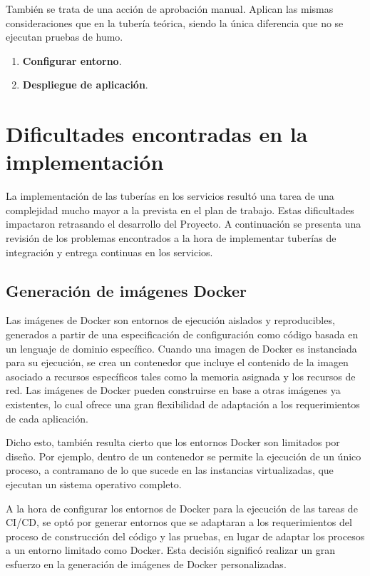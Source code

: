 También se trata de una acción de aprobación manual. Aplican las
mismas consideraciones que en la tubería teórica, siendo la única
diferencia que no se ejecutan pruebas de humo.

\begin{enumerate}
\item \textbf{Configurar entorno}.
\item \textbf{Despliegue de aplicación}.
\end{enumerate}
\section{Dificultades encontradas en la implementación}

La implementación de las tuberías en los servicios resultó una tarea
de una complejidad mucho mayor a la prevista en el plan de
trabajo. Estas dificultades impactaron retrasando el desarrollo del
Proyecto. A continuación se presenta una revisión de los problemas
encontrados a la hora de implementar tuberías de integración y entrega
continuas en los servicios.

\subsection{Generación de imágenes Docker}

Las imágenes de Docker son entornos de ejecución aislados y
reproducibles, generados a partir de una especificación de
configuración como código basada en un lenguaje de dominio
específico. Cuando una imagen de Docker es instanciada para su
ejecución, se crea un contenedor que incluye el contenido de la imagen
asociado a recursos específicos tales como la memoria asignada y los
recursos de red. Las imágenes de Docker pueden construirse en base a
otras imágenes ya existentes, lo cual ofrece una gran flexibilidad de
adaptación a los requerimientos de cada aplicación.

Dicho esto, también resulta cierto que los entornos Docker son
limitados por diseño. Por ejemplo, dentro de un contenedor se permite
la ejecución de un único proceso, a contramano de lo que sucede en las
instancias virtualizadas, que ejecutan un sistema operativo completo.

A la hora de configurar los entornos de Docker para la ejecución de
las tareas de CI/CD, se optó por generar entornos que se adaptaran a
los requerimientos del proceso de construcción del código y las
pruebas, en lugar de adaptar los procesos a un entorno limitado como
Docker. Esta decisión significó realizar un gran esfuerzo en la
generación de imágenes de Docker personalizadas.


